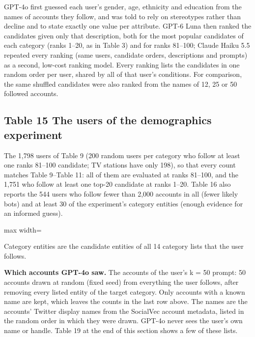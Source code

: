 \documentclass[10pt]{article}
\begin{document}
GPT-4o first guessed each user's gender, age, ethnicity and education from the names of accounts they follow, and was told to rely on stereotypes rather than decline and to state exactly one value per attribute. GPT-6 Luna then ranked the candidates given only that description, both for the most popular candidates of each category (ranks 1--20, as in Table 3) and for ranks 81--100; Claude Haiku 5.5 repeated every ranking (same users, candidate orders, descriptions and prompts) as a second, low-cost ranking model. Every ranking lists the candidates in one random order per user, shared by all of that user's conditions. For comparison, the same shuffled candidates were also ranked from the names of 12, 25 or 50 followed accounts.

\subsection*{Table 15 \textperiodcentered{} The users of the demographics experiment}
The 1,798 users of Table 9 (200 random users per category who follow at least one ranks 81--100 candidate; TV stations have only 198), so that every count matches Table 9--Table 11: all of them are evaluated at ranks 81--100, and the 1,751 who follow at least one top-20 candidate at ranks 1--20. Table 16 also reports the 544 users who follow fewer than 2,000 accounts in all (fewer likely bots) and at least 30 of the experiment's category entities (enough evidence for an informed guess).

\begin{center}\begin{adjustbox}{max width=\linewidth}

\end{adjustbox}\end{center}

{\small Category entities are the candidate entities of all 14 category lists that the user follows.}

\textbf{Which accounts GPT-4o saw.} The accounts of the user's k = 50 prompt: 50 accounts drawn at random (fixed seed) from everything the user follows, after removing every listed entity of the target category. Only accounts with a known name are kept, which leaves the counts in the last row above. The names are the accounts' Twitter display names from the SocialVec account metadata, listed in the random order in which they were drawn. GPT-4o never sees the user's own name or handle. Table 19 at the end of this section shows a few of these lists.
\end{document}
